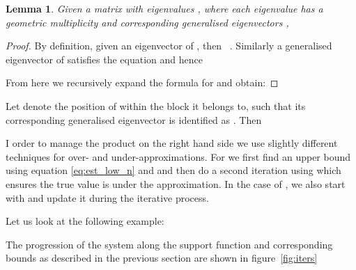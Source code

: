 \documentclass{IEEEtran}
\newtheorem{lemma}{Lemma}
\begin{document}
\begin{lemma}
\label{lemma:jordan_guards}
Given a matrix  with eigenvalues , where each eigenvalue  has a geometric multiplicity  and corresponding generalised eigenvectors ,
  
\end{lemma}
\begin{proof}
By definition, given an eigenvector  of , then ~\cite{horn2012matrix}. Similarly a generalised eigenvector  of  satisfies the equation  and  hence 

From here we recursively expand the formula for  and obtain:

\end{proof}

Let  denote the position of  within the block  it belongs to, such that its corresponding generalised eigenvector is identified as .
Then


I order to manage the product on the right hand side we use slightly different techniques for over- and under-approximations.
For  we first find an upper bound  using equation \eqref{eq:est_low_n} and 
and then do a second iteration using  which ensures the true value is under the approximation.
In the case of , we also start with  and update it during the iterative process.

Let us look at the following example:




The progression of the system along the support function and corresponding bounds as described in the previous section are shown in figure~\ref{fig:iters}
\end{document}
